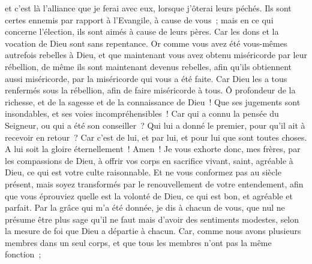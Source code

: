 \begin{multicols}{2}
et c'est là l'alliance que je ferai avec eux, lorsque j'ôterai leurs péchés.
Ils sont certes ennemis par rapport à l'Evangile, à cause de vous~; mais en ce qui concerne l'élection, ils sont aimés à cause de leurs pères.
Car les dons et la vocation de Dieu sont sans repentance.
Or comme vous avez été vous-mêmes autrefois rebelles à Dieu, et que maintenant vous avez obtenu miséricorde par leur rébellion,
de même ils sont maintenant devenus rebelles, afin qu'ils obtiennent aussi miséricorde, par la miséricorde qui vous a été faite.
Car Dieu les a tous renfermés sous la rébellion, afin de faire miséricorde à tous.
Ô profondeur de la richesse, et de la sagesse et de la connaissance de Dieu~! Que ses jugements sont insondables, et ses voies incompréhensibles~!
Car qui a connu la pensée du Seigneur, ou qui a été son conseiller~?
Qui lui a donné le premier, pour qu'il ait à recevoir en retour~?
Car c'est de lui, et par lui, et pour lui que sont toutes choses. A lui soit la gloire éternellement~! Amen~!
\VerseOne{}Je vous exhorte donc, mes frères, par les compassions de Dieu, à offrir vos corps en sacrifice vivant, saint, agréable à Dieu, ce qui est votre culte raisonnable.
Et ne vous conformez pas au siècle présent, mais soyez transformés par le renouvellement de votre entendement, afin que vous éprouviez quelle est la volonté de Dieu, ce qui est bon, et agréable et parfait.
Par la grâce qui m'a été donnée, je dis à chacun de vous, que nul ne présume être plus sage qu'il ne faut mais d'avoir des sentiments modestes, selon la mesure de foi que Dieu a départie à chacun.
Car, comme nous avons plusieurs membres dans un seul corps, et que tous les membres n'ont pas la même fonction~;

\end{multicols}
